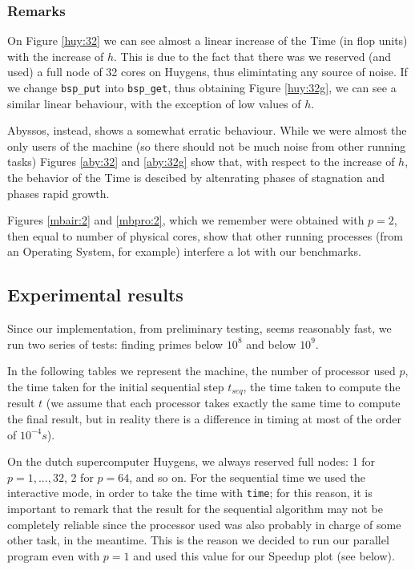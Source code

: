 \documentclass[a4paper,11pt]{article}
\begin{document}
\subsubsection{Remarks}

On Figure \ref{huy:32} we can see almost a linear increase of the Time (in flop units) with the increase of $h$. This is due to the fact that there was we reserved (and used) a full node of 32 cores on Huygens, thus elimintating any source of noise. If we change \verb|bsp_put| into \verb|bsp_get|, thus obtaining Figure \ref{huy:32g}, we can see a similar linear behaviour, with the exception of low values of $h$.

Abyssos, instead, shows a somewhat erratic behaviour. While we were almost the only users of the machine (so there should not be much noise from other running tasks) Figures \ref{aby:32} and \ref{aby:32g} show that, with respect to the increase of $h$, the behavior of the Time is descibed by altenrating phases of stagnation and phases rapid growth.

Figures \ref{mbair:2} and \ref{mbpro:2}, which we remember were obtained with $p=2$, then equal to number of physical cores, show that other running processes (from an Operating System, for example) interfere a lot with our benchmarks.

\subsection{Experimental results}

Since our implementation, from preliminary testing, seems reasonably fast, we run two series of tests: finding primes below $10^8$ and below $10^9$.

In the following tables we represent the machine, the number of processor used $p$, the time taken for the initial sequential step $t_{seq}$, the time taken to compute the result $t$ (we assume that each processor takes exactly the same time to compute the final result, but in reality there is a difference in timing at most of the order of $10^{-4} s$).

On the dutch supercomputer Huygens, we always reserved full nodes: 1 for $p=1,...,32$, 2 for $p=64$, and so on. For the sequential time we used the interactive mode, in order to take the time with \verb|time|; for this reason, it is important to remark that the result for the sequential algorithm may not be completely reliable since the processor used was also probably in charge of some other task, in the meantime. This is the reason we decided to run our parallel program even with $p=1$ and used this value for our Speedup plot (see below).
\end{document}
